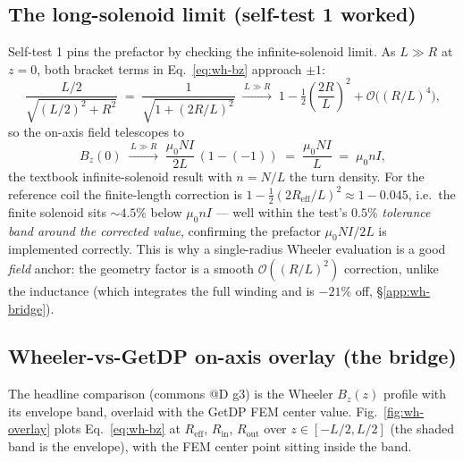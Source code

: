 \subsection{The long-solenoid limit (self-test 1 worked)}
\label{app:wh-longlimit}

Self-test 1 pins the prefactor by checking the infinite-solenoid limit. As
$L\!\gg\!R$ at $z\!=\!0$, both bracket terms in Eq.~\eqref{eq:wh-bz}
approach $\pm1$:
\begin{equation}
\frac{L/2}{\sqrt{(L/2)^2+R^2}} \;=\;
  \frac{1}{\sqrt{1+(2R/L)^2}} \;\xrightarrow{\,L\gg R\,}\;
  1 - \tfrac12\!\left(\frac{2R}{L}\right)^2 + \mathcal{O}\!\big((R/L)^4\big),
\end{equation}
so the on-axis field telescopes to
\begin{equation}
B_z(0) \;\xrightarrow{\,L\gg R\,}\; \frac{\mu_0 NI}{2L}\,(1-(-1))
  \;=\; \frac{\mu_0 NI}{L} \;=\; \mu_0 n I,
\label{eq:long-limit}
\end{equation}
the textbook infinite-solenoid result with $n=N/L$ the turn density. For
the reference coil the finite-length correction is
$1-\tfrac12(2R_{\text{eff}}/L)^2\approx1-0.045$, i.e.\ the finite solenoid
sits $\sim\!4.5$\% below $\mu_0 nI$ --- well within the test's $0.5$\%
\emph{tolerance band around the corrected value}, confirming the prefactor
$\mu_0 NI/2L$ is implemented correctly. This is why a single-radius Wheeler
evaluation is a good \emph{field} anchor: the geometry factor is a smooth
$\mathcal{O}((R/L)^2)$ correction, unlike the inductance (which integrates
the full winding and is $-21$\% off, \S\ref{app:wh-bridge}).

\subsection{Wheeler-vs-GetDP on-axis overlay (the bridge)}
\label{app:wh-chart}

The headline comparison (commons @D g3) is the Wheeler $B_z(z)$ profile
with its envelope band, overlaid with the GetDP FEM center value.
Fig.~\ref{fig:wh-overlay} plots Eq.~\eqref{eq:wh-bz} at $R_{\text{eff}}$,
$R_{\text{in}}$, $R_{\text{out}}$ over $z\!\in\![-L/2, L/2]$ (the shaded
band is the envelope), with the FEM center point sitting inside the band.

